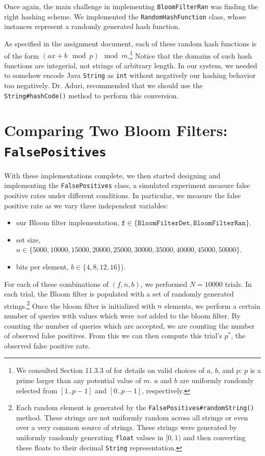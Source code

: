 \documentclass{article}
\begin{document}
Once again, the main challenge in implementing \texttt{BloomFilterRan} was
finding the right hashing scheme. We implemented the \texttt{RandomHashFunction}
class, whose instances represent a randomly generated hash function.

As specified in the assignment document, each of these random hash functions is
of the form $(ax + b \mod p) \mod m$.\footnote{
  We consulted Section 11.3.3 of \cite{cormen2009introduction} for details on
  valid choices of $a$, $b$, and $p$: $p$ is a prime larger than any potential
  value of $m$. $a$ and $b$ are uniformly randomly selected from $[1..p-1]$ and
  $[0..p-1]$, respectively.
} Notice that the domains of such hash functions are integerial, not strings of
arbitrary length. In our system, we needed to somehow encode Java
\texttt{String} as \texttt{int} without negatively our hashing behavior too
negatively. Dr. Aduri, recommended that we should use the
\texttt{String\#hashCode()} method to perform this conversion.


\section{Comparing Two Bloom Filters: \texttt{FalsePositives}}

With these implementations complete, we then started designing and implementing
the \texttt{FalsePositives} class, a simulated experiment measure false positive
rates under different conditions. In particular, we measure the false positive
rate as we vary three independent variables:

\begin{itemize}
  \item our Bloom filter implementation, $\texttt{f} \in
        \{ \texttt{BloomFilterDet}, \texttt{BloomFilterRan} \}$.
  \item set size, $n \in \{ 5000, 10000, 15000, 20000, 25000, 30000, 35000,
        40000, 45000, 50000 \}$.
  \item bits per element, $b \in \{ 4, 8, 12, 16 \}$).
\end{itemize}

For each of these combinations of $(f, n, b)$, we performed $N = 10000$ trials.
In each trial, the Bloom filter is populated with a set of randomly generated
strings.\footnote{
  Each random element is generated by the \texttt{FalsePositives\#randomString()}
  method. These strings are not uniformly random across all strings or even over
  a very common source of strings. These strings were generated by uniformly
  randomly generating \texttt{float} values in $[0, 1)$ and then converting
  these floats to their decimal \texttt{String} representation.
} Once the bloom filter is initialized with $n$ elements, we perform a certain
number of queries with values which were \textit{not} added to the bloom filter.
By counting the number of queries which are accepted, we are counting the number
of observed false positives. From this we can then compute this trial's $p^*$,
the observed false positive rate.
\end{document}
